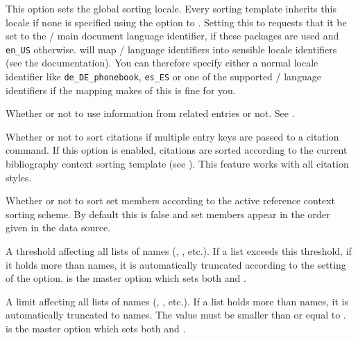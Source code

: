 \documentclass{ltxdockit}[2011/03/25]
\newcommand*{\biber}{\sty{biber}\xspace}
\begin{document}
\begin{optionlist}

This option sets the global sorting locale. Every sorting template inherits this locale if none is specified using the  option to . Setting this to  requests that it be set to the / main document language identifier, if these packages are used and \texttt{en\_US} otherwise. \biber will map / language identifiers into sensible locale identifiers (see the \biber documentation). You can therefore specify either a normal locale identifier like \texttt{de\_DE\_phonebook}, \texttt{es\_ES} or one of the supported / language identifiers if the mapping \biber makes of this is fine for you.


Whether or not to use information from related entries or not. See .


Whether or not to sort citations if multiple entry keys are passed to a citation command. If this option is enabled, citations are sorted according to the current bibliography context sorting template (see ). This feature works with all citation styles.


Whether or not to sort set members according to the active reference context sorting scheme. By default this is false and set members appear in the order given in the data source.


A threshold affecting all lists of names (, , etc.). If a list exceeds this threshold, \ie if it holds more than  names, it is automatically truncated according to the setting of the  option.  is the master option which sets both  and .


A limit affecting all lists of names (, , etc.). If a list holds more than  names, it is automatically truncated to  names. The  value must be smaller than or equal to .  is the master option which sets both  and .


\end{optionlist}
\end{document}
